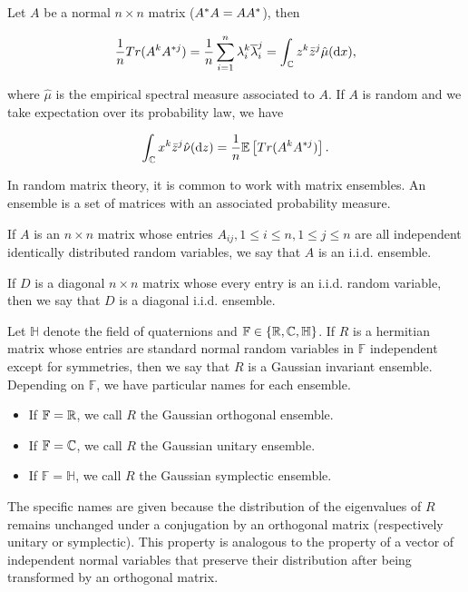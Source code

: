 \begin{theorem}
    Let $A$ be a normal $n\times n$ matrix ($A^*A = AA^*$), then 

    \begin{equation*}
        \frac1n Tr(A^k A^{*j}) = \frac1n \sum_{i=1}^n \lambda_i^k \overline{\lambda}_i^j = \int_\mathbb C z^k \bar{z}^j \hat\mu(\mathrm d x),
    \end{equation*}

    \noindent where $\hat\mu$ is the empirical spectral measure associated to $A$. If $A$ is random and we take expectation over its probability law, we have

    \begin{equation*}
        \int_\mathbb C x^k \bar{z}^j \hat\nu(\mathrm d z) = \frac1n \mathbb E \left[  Tr(A^k A^{*j})  \right].
    \end{equation*}
\end{theorem}

In random matrix theory, it is common to work with matrix ensembles. An ensemble is a set of matrices with an associated probability measure.

\begin{example}
    If $A$ is an $n\times n$ matrix whose entries $A_{ij}, 1 \le i \le n, 1\le j \le n$ are all independent identically distributed random variables, we say that $A$ is an i.i.d. ensemble.
\end{example}

\begin{example}
    If $D$ is a diagonal $n\times n$ matrix whose every entry is an i.i.d. random variable, then we say that $D$ is a diagonal i.i.d. ensemble.
\end{example}

\begin{example}
    Let $\mathbb H$ denote the field of quaternions and $\mathbb F \in \{ \mathbb R, \mathbb C, \mathbb H \}$. If $R$ is a hermitian matrix whose entries are standard normal random variables in $\mathbb F$ independent except for symmetries, then we say that $R$ is a Gaussian invariant ensemble. Depending on $\mathbb F$, we have particular names for each ensemble.

    \begin{itemize}
        \item If $\mathbb F = \mathbb R$, we call $R$ the Gaussian orthogonal ensemble.
        \item If $\mathbb F = \mathbb C$, we call $R$ the Gaussian unitary ensemble.
        \item If $\mathbb F = \mathbb H$, we call $R$ the Gaussian symplectic ensemble.
    \end{itemize}

    The specific names are given because the distribution of the eigenvalues of $R$ remains unchanged under a conjugation by an orthogonal matrix (respectively unitary or symplectic). This property is analogous to the property of a vector of independent normal variables that preserve their distribution after being transformed by an orthogonal matrix.
\end{example}

